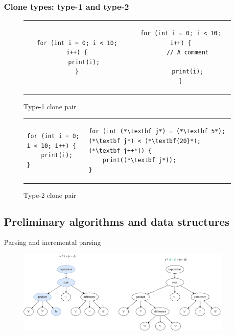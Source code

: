 \documentclass[aspectratio=1610, xcolor=table]{beamer}
\begin{document}
\begin{frame}[fragile]
	\frametitle{Clone types: type-1 and type-2}
    \begin{figure}[t]
		\begin{center}
			\begin{tabular}{c | c}
				\begin{lstlisting}
for (int i = 0; i < 10;   i++) {
    print(i);
}
\end{lstlisting} &
				\begin{lstlisting}
for (int i = 0; i < 10; i++) {
    // A comment

    print(i);
}
            \end{lstlisting}
			\end{tabular}
		\end{center}
        \caption{Type-1 clone pair}
    \end{figure}
    \begin{figure}[t]
        	\begin{center}
        \begin{tabular}{p{6cm} | p{6cm}}
\begin{lstlisting}
for (int i = 0; i < 10; i++) {
    print(i);
}
\end{lstlisting} & \begin{lstlisting}
for (int (*\textbf j*) = (*\textbf 5*); (*\textbf j*) < (*\textbf{20}*); (*\textbf j++*)) {
    print((*\textbf j*));
}
\end{lstlisting}
		\end{tabular}
	\end{center}

        \caption{Type-2 clone pair}
    \end{figure}

\end{frame}

\subsection{Preliminary algorithms and data structures}
\begin{frame}{Parsing and incremental parsing}
    \begin{figure}
        \begin{center}
            \includegraphics[width=0.95\textwidth]{figures/incrementalparsing.drawio.pdf}
        \end{center}
    \end{figure}
\end{frame}
\end{document}
